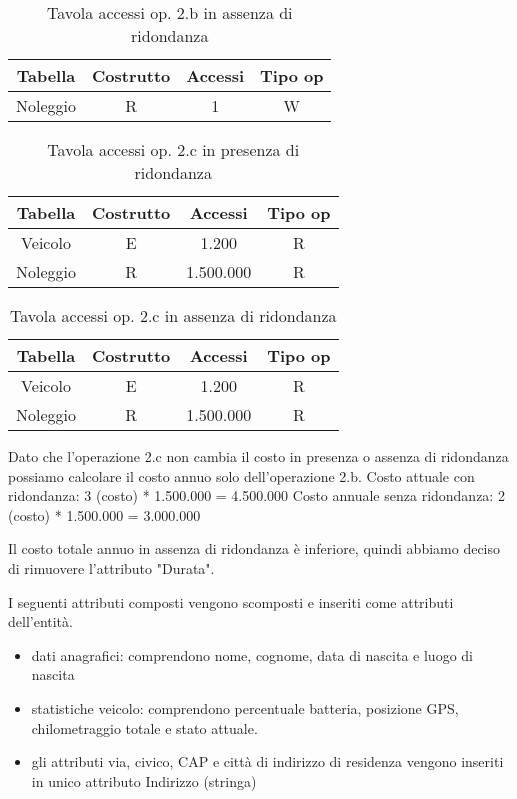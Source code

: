 \documentclass{article}
\begin{document}
\begin{table}[h]
  \centering
  \begin{tabular}{|c|c|c|c|}
    \hline
    Tabella & Costrutto & Accessi & Tipo op \\ \hline
    Noleggio & R & 1 & W \\ \hline 
  \end{tabular}
  \caption{Tavola accessi op. 2.b in assenza di ridondanza}
\end{table}

\begin{table}[h]
  \centering
  \begin{tabular}{|c|c|c|c|}
    \hline
    Tabella & Costrutto & Accessi & Tipo op \\ \hline
    Veicolo & E & 1.200 & R  \\ \hline
    Noleggio & R & 1.500.000 & R \\ \hline
  \end{tabular}
  \caption{Tavola accessi op. 2.c in presenza di ridondanza}
\end{table}

\begin{table}[h]
  \centering
  \begin{tabular}{|c|c|c|c|}
    \hline
    Tabella & Costrutto & Accessi & Tipo op \\ \hline
    Veicolo & E & 1.200 & R  \\ \hline
    Noleggio & R & 1.500.000 & R \\ \hline
  \end{tabular}
  \caption{Tavola accessi op. 2.c in assenza di ridondanza}
\end{table}

Dato che l'operazione 2.c non cambia il costo in presenza o assenza di ridondanza possiamo calcolare il costo annuo solo dell'operazione 2.b.
Costo attuale con ridondanza: 3 (costo) * 1.500.000 = 4.500.000
Costo annuale senza ridondanza: 2 (costo) * 1.500.000 = 3.000.000

Il costo totale annuo in assenza di ridondanza è inferiore, quindi abbiamo deciso di rimuovere l'attributo "Durata".


I seguenti attributi composti vengono scomposti e inseriti come attributi dell'entità.
\begin{itemize}
    \item dati anagrafici: comprendono nome, cognome, data di nascita e luogo di nascita
    \item statistiche veicolo: comprendono percentuale batteria, posizione GPS, chilometraggio totale e stato attuale.
    \item gli attributi via, civico, CAP e città di indirizzo di residenza vengono inseriti in unico attributo Indirizzo (stringa)
\end{itemize}
\end{document}

